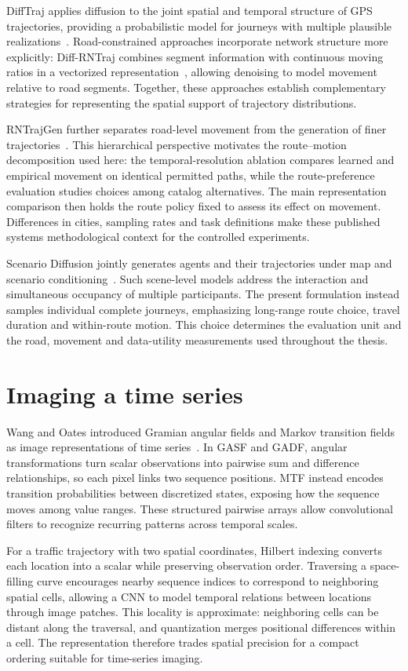 DiffTraj applies diffusion to the joint spatial and temporal structure of GPS trajectories, providing a probabilistic model for journeys with multiple plausible realizations~\cite{difftraj}. Road-constrained approaches incorporate network structure more explicitly: Diff-RNTraj combines segment information with continuous moving ratios in a vectorized representation~\cite{diffrn}, allowing denoising to model movement relative to road segments. Together, these approaches establish complementary strategies for representing the spatial support of trajectory distributions.

RNTrajGen further separates road-level movement from the generation of finer trajectories~\cite{rntrajgen}. This hierarchical perspective motivates the route--motion decomposition used here: the temporal-resolution ablation compares learned and empirical movement on identical permitted paths, while the route-preference evaluation studies choices among catalog alternatives. The main representation comparison then holds the route policy fixed to assess its effect on movement. Differences in cities, sampling rates and task definitions make these published systems methodological context for the controlled experiments.

Scenario Diffusion jointly generates agents and their trajectories under map and scenario conditioning~\cite{scenario}. Such scene-level models address the interaction and simultaneous occupancy of multiple participants. The present formulation instead samples individual complete journeys, emphasizing long-range route choice, travel duration and within-route motion. This choice determines the evaluation unit and the road, movement and data-utility measurements used throughout the thesis.

\section{Imaging a time series}
Wang and Oates introduced Gramian angular fields and Markov transition fields as image representations of time series~\cite{wang}. In GASF and GADF, angular transformations turn scalar observations into pairwise sum and difference relationships, so each pixel links two sequence positions. MTF instead encodes transition probabilities between discretized states, exposing how the sequence moves among value ranges. These structured pairwise arrays allow convolutional filters to recognize recurring patterns across temporal scales.

For a traffic trajectory with two spatial coordinates, Hilbert indexing converts each location into a scalar while preserving observation order. Traversing a space-filling curve encourages nearby sequence indices to correspond to neighboring spatial cells, allowing a CNN to model temporal relations between locations through image patches. This locality is approximate: neighboring cells can be distant along the traversal, and quantization merges positional differences within a cell. The representation therefore trades spatial precision for a compact ordering suitable for time-series imaging.

